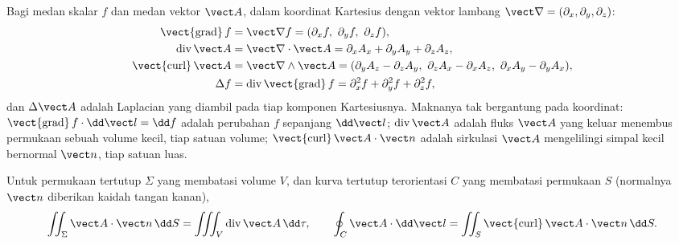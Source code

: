 \begin{definition}\label{def:b2:maxwell-equations:operators}
Bagi medan skalar $f$ dan medan vektor $\vect A$, dalam koordinat
Kartesius dengan vektor lambang $\vect\nabla = (\partial_x, \partial_y,
\partial_z)$:
\begin{align*}
\operatorname{\vect{grad}}f &= \vect\nabla f = (\partial_xf,\ \partial_yf,\ \partial_zf) ,\\
\operatorname{div}\vect A &= \vect\nabla\cdot\vect A = \partial_xA_x + \partial_yA_y + \partial_zA_z ,\\
\operatorname{\vect{curl}}\vect A &= \vect\nabla\wedge\vect A = (\partial_yA_z - \partial_zA_y,\ \partial_zA_x - \partial_xA_z,\ \partial_xA_y - \partial_yA_x) ,\\
\Delta f &= \operatorname{div}\operatorname{\vect{grad}}f = \partial_x^2f + \partial_y^2f + \partial_z^2f ,
\end{align*}
dan $\Delta\vect A$ adalah Laplacian yang diambil pada tiap komponen Kartesiusnya.
Maknanya tak bergantung pada koordinat: $\operatorname{\vect{grad}}f
\cdot\dd\vect l = \dd f$ adalah perubahan $f$ sepanjang $\dd\vect l$; $\operatorname{div}
\vect A$ adalah fluks $\vect A$ yang keluar menembus permukaan sebuah volume
kecil, tiap satuan volume; $\operatorname{\vect{curl}}\vect A\cdot\vect n$ adalah
sirkulasi $\vect A$ mengelilingi simpal kecil bernormal $\vect n$, tiap satuan
luas.
\end{definition}

\begin{theorem}\label{thm:b2:maxwell-equations:theorems}
Untuk permukaan tertutup $\Sigma$ yang membatasi volume $V$, dan kurva
tertutup terorientasi $C$ yang membatasi permukaan $S$ (normalnya $\vect n$ diberikan
kaidah tangan kanan),
\[
\iint_\Sigma\vect A\cdot\vect n\,\dd S = \iiint_V\operatorname{div}\vect A\,\dd\tau ,
\qquad
\oint_C\vect A\cdot\dd\vect l = \iint_S\operatorname{\vect{curl}}\vect A\cdot\vect n\,\dd S .
\]
\end{theorem}
\admitted

